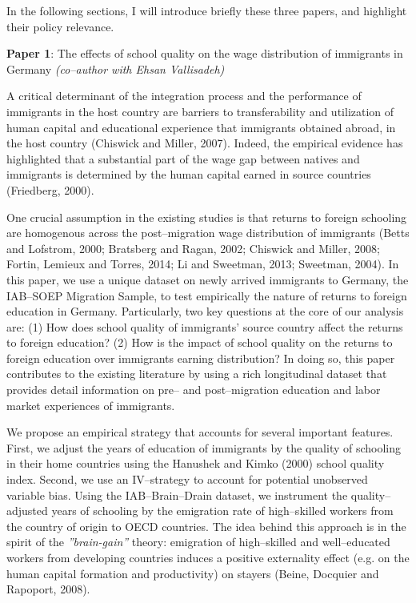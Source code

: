 \documentclass[a4paper, 11pt]{article} %
\begin{document}
In the following sections, I will introduce briefly these three papers, and highlight their policy relevance.

\vspace{15pt}

\textbf{Paper 1}: The effects of school quality on the wage distribution of immigrants in Germany \textit{ (co--author with Ehsan Vallisadeh)}

\vspace{15pt}

A critical determinant of the integration process and the performance of immigrants in the host country are barriers to transferability and utilization of human capital and educational experience that immigrants obtained abroad, in the host country (Chiswick and Miller, 2007). Indeed, the empirical evidence has highlighted that a substantial part of the wage gap between natives and immigrants is determined by the human capital earned in source countries (Friedberg, 2000).

One crucial assumption in the existing studies is that returns to foreign schooling are homogenous across the post--migration wage distribution of immigrants (Betts and Lofstrom, 2000; Bratsberg and Ragan, 2002; Chiswick and Miller, 2008; Fortin, Lemieux and Torres, 2014; Li and Sweetman, 2013; Sweetman, 2004). In this paper, we use a unique dataset on newly arrived immigrants to Germany, the IAB--SOEP Migration Sample, to test empirically the nature of returns to foreign education in Germany. Particularly, two key questions at the core of our analysis are: (1) How does school quality of immigrants' source country affect the returns to foreign education? (2) How is the impact of school quality on the returns to foreign education over immigrants earning distribution? In doing so, this paper contributes to the existing literature by using a rich longitudinal dataset that provides detail information on pre-- and post--migration education and labor market experiences of immigrants.

We propose an empirical strategy that accounts for several important features. First, we adjust the years of education of immigrants by the quality of schooling in their home countries using the Hanushek and Kimko (2000) school quality index. Second, we use an IV--strategy to account for potential unobserved variable bias. Using the IAB--Brain--Drain dataset, we instrument the quality--adjusted years of schooling by the emigration rate of high--skilled workers from the country of origin to OECD countries. The idea behind this approach is in the spirit of the \textit{''brain-gain''} theory: emigration of high--skilled and well--educated workers from developing countries induces a positive externality effect (e.g. on the human capital formation and productivity) on stayers (Beine, Docquier and Rapoport, 2008).
\end{document}
